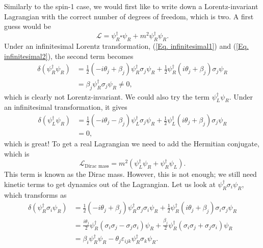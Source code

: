 \documentclass[11pt]{article}
\theoremstyle{definition}
\begin{document}
Similarly to the spin-1 case, we would first like to write down a Lorentz-invariant Lagrangian with the correct number of degrees of freedom, which is two. A first guess would be
\begin{equation}
    \mathcal{L} = \psi_R^\dagger\square\psi_R + m^2 \psi_R^\dagger\psi_R.
\end{equation}
Under an infinitesimal Lorentz transformation, (\ref{Eq. infinitesimal1}) and (\ref{Eq. infinitesimal2}), the second term becomes
\begin{equation}
    \begin{aligned}
        \delta(\psi_R^\dagger\psi_R) &= \frac{1}{2}(-i\theta_j + \beta_j)\psi_R^\dagger\sigma_j\psi_R + \frac{1}{2}\psi_R^\dagger (i\theta_j + \beta_j)\sigma_j\psi_R\\
        &= \beta_j\psi_R^\dagger\sigma_j\psi_R \neq 0,
    \end{aligned}
\end{equation}
which is clearly not Lorentz-invariant. 
We could also try the term $\psi_L^\dagger\psi_R$. Under an infinitesimal transformation, it gives
\begin{equation}
    \begin{aligned}
        \delta(\psi_L^\dagger\psi_R) &= \frac{1}{2}(-i\theta_j - \beta_j)\psi_L^\dagger\sigma_j\psi_R + \frac{1}{2}\psi_L^\dagger (i\theta_j + \beta_j)\sigma_j\psi_R\\
        &= 0,
    \end{aligned}    
\end{equation}
which is great! To get a real Lagrangian we need to add the Hermitian conjugate, which is 
\begin{equation}
    \mathcal{L}_\text{Dirac mass} = m^2(\psi_L^\dagger\psi_R + \psi_R^\dagger\psi_L).
\end{equation}
This term is known as the Dirac mass. However, this is not enough; we still need kinetic terms to get dynamics out of the Lagrangian. Let us look at $\psi_R^\dagger\sigma_i\psi_R$, which transforms as
\begin{equation}
    \begin{aligned}
        \delta(\psi_R^\dagger\sigma_i\psi_R) &= \frac{1}{2}(-i\theta_j + \beta_j)\psi_R^\dagger\sigma_j\sigma_i\psi_R + \frac{1}{2}\psi_R^\dagger (i\theta_j + \beta_j)\sigma_i\sigma_j\psi_R\\
        &= \frac{i\theta_j}{2}\psi_R^\dagger(\sigma_i\sigma_j-\sigma_j\sigma_i)\psi_R + \frac{\beta_j}{2}\psi_R^\dagger(\sigma_i\sigma_j+\sigma_j\sigma_i)\psi_R\\
        &= \beta_i \psi_R^\dagger\psi_R - \theta_j\varepsilon_{ijk}\psi_R^\dagger\sigma_k\psi_R.
    \end{aligned}
\end{equation}
\end{document}
